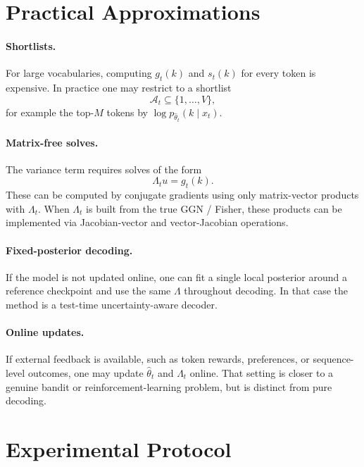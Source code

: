 \documentclass[11pt]{article}
\begin{document}
\section{Practical Approximations}

\paragraph{Shortlists.}
For large vocabularies, computing $g_t(k)$ and $s_t(k)$ for every token
is expensive.
In practice one may restrict to a shortlist
\[
\mathcal{A}_t \subseteq \{1,\dots,V\},
\]
for example the top-$M$ tokens by $\log p_{\hat\theta_t}(k\mid x_t)$.

\paragraph{Matrix-free solves.}
The variance term requires solves of the form
\[
\Lambda_t u = g_t(k).
\]
These can be computed by conjugate gradients using only matrix-vector
products with $\Lambda_t$.
When $\Lambda_t$ is built from the true GGN / Fisher, these products can
be implemented via Jacobian-vector and vector-Jacobian operations.

\paragraph{Fixed-posterior decoding.}
If the model is not updated online, one can fit a single local posterior
around a reference checkpoint and use the same $\Lambda$ throughout
decoding.
In that case the method is a test-time uncertainty-aware decoder.

\paragraph{Online updates.}
If external feedback is available, such as token rewards, preferences,
or sequence-level outcomes, one may update $\hat\theta_t$ and $\Lambda_t$
online.
That setting is closer to a genuine bandit or reinforcement-learning
problem, but is distinct from pure decoding.

\section{Experimental Protocol}
\end{document}
